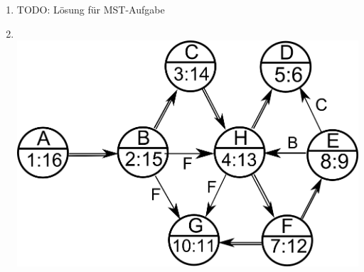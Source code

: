 \documentclass{scrartcl}
\begin{document}
\begin{enumerate}[(1)]
\item TODO: Lösung für MST-Aufgabe
\item \ \\ \includegraphics[width=0.75\linewidth]{images/tiefensuche_loes}
\end{enumerate}
\end{document}
